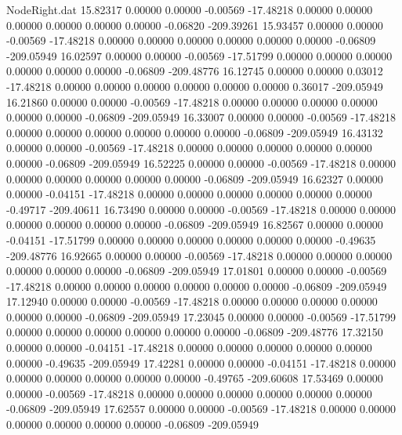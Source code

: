 \begin{filecontents}{NodeRight.dat}
  15.82317    0.00000    0.00000    -0.00569  -17.48218    0.00000    0.00000    0.00000    0.00000    0.00000    0.00000   -0.06820 -209.39261
  15.93457    0.00000    0.00000    -0.00569  -17.48218    0.00000    0.00000    0.00000    0.00000    0.00000    0.00000   -0.06809 -209.05949
  16.02597    0.00000    0.00000    -0.00569  -17.51799    0.00000    0.00000    0.00000    0.00000    0.00000    0.00000   -0.06809 -209.48776
  16.12745    0.00000    0.00000     0.03012  -17.48218    0.00000    0.00000    0.00000    0.00000    0.00000    0.00000    0.36017 -209.05949
  16.21860    0.00000    0.00000    -0.00569  -17.48218    0.00000    0.00000    0.00000    0.00000    0.00000    0.00000   -0.06809 -209.05949
  16.33007    0.00000    0.00000    -0.00569  -17.48218    0.00000    0.00000    0.00000    0.00000    0.00000    0.00000   -0.06809 -209.05949
  16.43132    0.00000    0.00000    -0.00569  -17.48218    0.00000    0.00000    0.00000    0.00000    0.00000    0.00000   -0.06809 -209.05949
  16.52225    0.00000    0.00000    -0.00569  -17.48218    0.00000    0.00000    0.00000    0.00000    0.00000    0.00000   -0.06809 -209.05949
  16.62327    0.00000    0.00000    -0.04151  -17.48218    0.00000    0.00000    0.00000    0.00000    0.00000    0.00000   -0.49717 -209.40611
  16.73490    0.00000    0.00000    -0.00569  -17.48218    0.00000    0.00000    0.00000    0.00000    0.00000    0.00000   -0.06809 -209.05949
  16.82567    0.00000    0.00000    -0.04151  -17.51799    0.00000    0.00000    0.00000    0.00000    0.00000    0.00000   -0.49635 -209.48776
  16.92665    0.00000    0.00000    -0.00569  -17.48218    0.00000    0.00000    0.00000    0.00000    0.00000    0.00000   -0.06809 -209.05949
  17.01801    0.00000    0.00000    -0.00569  -17.48218    0.00000    0.00000    0.00000    0.00000    0.00000    0.00000   -0.06809 -209.05949
  17.12940    0.00000    0.00000    -0.00569  -17.48218    0.00000    0.00000    0.00000    0.00000    0.00000    0.00000   -0.06809 -209.05949
  17.23045    0.00000    0.00000    -0.00569  -17.51799    0.00000    0.00000    0.00000    0.00000    0.00000    0.00000   -0.06809 -209.48776
  17.32150    0.00000    0.00000    -0.04151  -17.48218    0.00000    0.00000    0.00000    0.00000    0.00000    0.00000   -0.49635 -209.05949
  17.42281    0.00000    0.00000    -0.04151  -17.48218    0.00000    0.00000    0.00000    0.00000    0.00000    0.00000   -0.49765 -209.60608
  17.53469    0.00000    0.00000    -0.00569  -17.48218    0.00000    0.00000    0.00000    0.00000    0.00000    0.00000   -0.06809 -209.05949
  17.62557    0.00000    0.00000    -0.00569  -17.48218    0.00000    0.00000    0.00000    0.00000    0.00000    0.00000   -0.06809 -209.05949

\end{filecontents}
